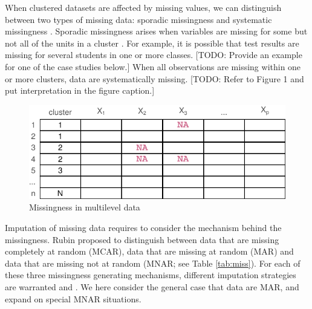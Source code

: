 \documentclass[
]{jss}
\begin{document}
When clustered datasets are affected by missing values, we can
distinguish between two types of missing data: sporadic missingness and
systematic missingness \citep{resc13}. Sporadic missingness arises when
variables are missing for some but not all of the units in a cluster
\citep{buur18, jola18}. For example, it is possible that test results
are missing for several students in one or more classes. {[}TODO:
Provide an example for one of the case studies below.{]} When all
observations are missing within one or more clusters, data are
systematically missing. {[}TODO: Refer to Figure 1 and put
interpretation in the figure caption.{]}

\begin{CodeChunk}
\begin{figure}

{\centering \includegraphics{Imputation_of_Incomplete_Multilevel_Data_files/figure-latex/patterns-1} 

}

\caption[Missingness in multilevel data]{Missingness in multilevel data}\label{fig:patterns}
\end{figure}
\end{CodeChunk}

Imputation of missing data requires to consider the mechanism behind the
missingness. Rubin proposed to distinguish between data that are missing
completely at random (MCAR), data that are missing at random (MAR) and
data that are missing not at random (MNAR; see Table \ref{tab:miss}).
For each of these three missingness generating mechanisms, different
imputation strategies are warranted \citet{yuce08} and \citet{hox15}. We
here consider the general case that data are MAR, and expand on special
MNAR situations.
\end{document}
